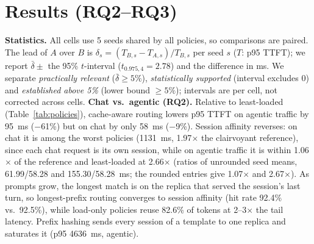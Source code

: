 \documentclass[conference]{IEEEtran}
\begin{document}
\section{Results (RQ2--RQ3)}
\label{sec:results}

\textbf{Statistics.} All cells use 5 seeds shared by all policies, so comparisons are paired. The lead of $A$ over $B$ is $\delta_s=(T_{B,s}-T_{A,s})/T_{B,s}$ per seed $s$ ($T$: p95 TTFT); we report $\bar\delta\pm$ the 95\% $t$-interval ($t_{0.975,4}=2.78$) and the difference in ms. We separate \emph{practically relevant} ($\bar\delta\ge5\%$), \emph{statistically supported} (interval excludes 0) and \emph{established above 5\%} (lower bound $\ge5\%$); intervals are per cell, not corrected across cells. \textbf{Chat vs.\ agentic (RQ2).} Relative to least-loaded (Table~\ref{tab:policies}), cache-aware routing lowers p95 TTFT on agentic traffic by 95~ms ($-$61\%) but on chat by only 58~ms ($-$9\%). Session affinity reverses: on chat it is among the worst policies (1131~ms, 1.97$\times$ the clairvoyant reference), since each chat request is its own session, while on agentic traffic it is within 1.06$\times$ of the reference and least-loaded at 2.66$\times$ (ratios of unrounded seed means, 61.99/58.28 and 155.30/58.28~ms; the rounded entries give 1.07$\times$ and 2.67$\times$). As prompts grow, the longest match is on the replica that served the session's last turn, so longest-prefix routing converges to session affinity (hit rate 92.4\% vs.\ 92.5\%), while load-only policies reuse 82.6\% of tokens at 2--3$\times$ the tail latency. Prefix hashing sends every session of a template to one replica and saturates it (p95 4636~ms, agentic).
\end{document}
